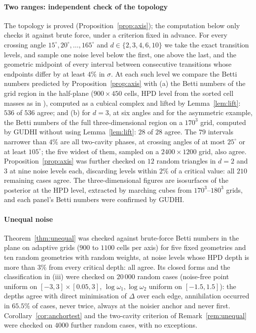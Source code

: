 \paragraph{Two ranges: independent check of the topology} The topology is proved (Proposition~\ref{prop:axis}); the
computation below only checks it against brute force, under a criterion fixed in advance. For every crossing angle
$15^\circ, 20^\circ, \dots, 165^\circ$ and $d \in \{2, 3, 4, 6, 10\}$ we take the exact transition levels, and sample one noise
level below the first, one above the last, and the geometric midpoint of every interval between consecutive transitions
whose endpoints differ by at least $4\%$ in $\sigma$. At each such level we compare the Betti numbers predicted by
Proposition~\ref{prop:axis} with (a) the Betti numbers of the grid region in the half-plane ($900 \times 450$ cells, HPD
level from the sorted cell masses as in \citet{hyndman1996}), computed as a cubical complex and lifted by
Lemma~\ref{lem:lift}: $536$ of $536$ agree; and (b) for $d = 3$, at six angles and for the asymmetric example, the Betti
numbers of the full three-dimensional region on a $170^3$ grid, computed by GUDHI \citep{gudhi2014} without using
Lemma~\ref{lem:lift}: $28$ of $28$ agree. The $79$ intervals narrower than $4\%$ are all two-cavity phases, at crossing
angles of at most $25^\circ$ or at least $105^\circ$; the five widest of them, sampled on a $2400 \times 1200$ grid, also
agree. Proposition~\ref{prop:axis} was further checked on $12$ random triangles in $d = 2$ and $3$ at nine noise levels
each, discarding levels within $2\%$ of a critical value: all $210$ remaining cases agree. The three-dimensional figures
are isosurfaces of the posterior at the HPD level, extracted by marching cubes \citep{lorensen1987} from $170^3$--$180^3$
grids, and each panel's Betti numbers were confirmed by GUDHI.

\paragraph{Unequal noise} Theorem~\ref{thm:unequal} was checked against brute-force Betti numbers in the plane on adaptive
grids ($900$ to $1100$ cells per axis) for five fixed geometries and ten random geometries with random weights, at noise
levels whose HPD depth is more than $3\%$ from every critical depth: all agree. Its closed forms and the classification in (iii) were checked on
$20\,000$ random cases (noise-free point uniform on $[-3, 3] \times [0.05, 3]$, $\log \omega_1, \log \omega_2$ uniform on
$[-1.5, 1.5]$): the depths agree with direct minimisation of $\Delta$ over each edge, annihilation occurred in $65.5\%$ of
cases, never twice, always at the noisier anchor and never first. Corollary~\ref{cor:anchortest} and the two-cavity
criterion of Remark~\ref{rem:unequal} were checked on $4000$ further random cases, with no exceptions.

